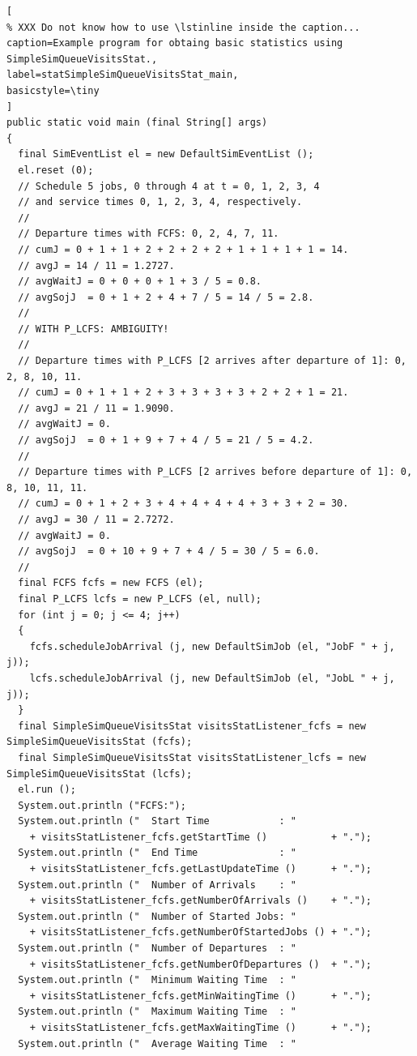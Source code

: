 \documentclass[12pt]{book}
\begin{document}
\begin{lstlisting}[
% XXX Do not know how to use \lstinline inside the caption...
caption=Example program for obtaing basic statistics using SimpleSimQueueVisitsStat.,
label=statSimpleSimQueueVisitsStat_main,
basicstyle=\tiny
]
public static void main (final String[] args)
{
  final SimEventList el = new DefaultSimEventList ();
  el.reset (0);
  // Schedule 5 jobs, 0 through 4 at t = 0, 1, 2, 3, 4
  // and service times 0, 1, 2, 3, 4, respectively.
  //
  // Departure times with FCFS: 0, 2, 4, 7, 11.
  // cumJ = 0 + 1 + 1 + 2 + 2 + 2 + 2 + 1 + 1 + 1 + 1 = 14.
  // avgJ = 14 / 11 = 1.2727.
  // avgWaitJ = 0 + 0 + 0 + 1 + 3 / 5 = 0.8.
  // avgSojJ  = 0 + 1 + 2 + 4 + 7 / 5 = 14 / 5 = 2.8.
  //
  // WITH P_LCFS: AMBIGUITY!
  //
  // Departure times with P_LCFS [2 arrives after departure of 1]: 0, 2, 8, 10, 11.
  // cumJ = 0 + 1 + 1 + 2 + 3 + 3 + 3 + 3 + 2 + 2 + 1 = 21.
  // avgJ = 21 / 11 = 1.9090.
  // avgWaitJ = 0.
  // avgSojJ  = 0 + 1 + 9 + 7 + 4 / 5 = 21 / 5 = 4.2.
  //
  // Departure times with P_LCFS [2 arrives before departure of 1]: 0, 8, 10, 11, 11.
  // cumJ = 0 + 1 + 2 + 3 + 4 + 4 + 4 + 4 + 3 + 3 + 2 = 30.
  // avgJ = 30 / 11 = 2.7272.    
  // avgWaitJ = 0.
  // avgSojJ  = 0 + 10 + 9 + 7 + 4 / 5 = 30 / 5 = 6.0.
  //
  final FCFS fcfs = new FCFS (el);
  final P_LCFS lcfs = new P_LCFS (el, null);
  for (int j = 0; j <= 4; j++)
  {
    fcfs.scheduleJobArrival (j, new DefaultSimJob (el, "JobF " + j, j));
    lcfs.scheduleJobArrival (j, new DefaultSimJob (el, "JobL " + j, j));
  }
  final SimpleSimQueueVisitsStat visitsStatListener_fcfs = new SimpleSimQueueVisitsStat (fcfs);
  final SimpleSimQueueVisitsStat visitsStatListener_lcfs = new SimpleSimQueueVisitsStat (lcfs);
  el.run ();
  System.out.println ("FCFS:");
  System.out.println ("  Start Time            : "
    + visitsStatListener_fcfs.getStartTime ()           + ".");
  System.out.println ("  End Time              : "
    + visitsStatListener_fcfs.getLastUpdateTime ()      + ".");
  System.out.println ("  Number of Arrivals    : "
    + visitsStatListener_fcfs.getNumberOfArrivals ()    + ".");
  System.out.println ("  Number of Started Jobs: "
    + visitsStatListener_fcfs.getNumberOfStartedJobs () + ".");
  System.out.println ("  Number of Departures  : "
    + visitsStatListener_fcfs.getNumberOfDepartures ()  + ".");
  System.out.println ("  Minimum Waiting Time  : "
    + visitsStatListener_fcfs.getMinWaitingTime ()      + ".");
  System.out.println ("  Maximum Waiting Time  : "
    + visitsStatListener_fcfs.getMaxWaitingTime ()      + ".");
  System.out.println ("  Average Waiting Time  : "

\end{lstlisting}
\end{document}
